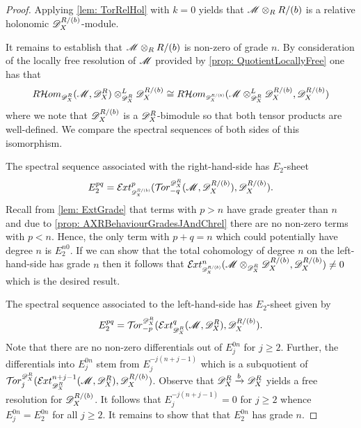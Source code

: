\begin{proof}
  Applying \cref{lem: TorRelHol} with $k=0$ yields that $\mathscr{M} \otimes_R R/(b)$ is a relative holonomic $\mathscr{D}_X^{R/(b)}$-module.

  It remains to establish that $\mathscr{M} \otimes_R R/(b)$ is non-zero of grade $n$.
  By consideration of the locally free resolution of $\mathscr{M}$ provided by \cref{prop: QuotientLocallyFree} one has that
  $$R\Hom_{\scaleto{\D_X^R}{8pt}}(\M,\D_X^R)\otimes_{\scaleto{\D_X^R}{8pt}}^L \D_X^{R/(b)} \cong R \Hom_{\scaleto{\D_X^{R/(b)}}{8pt}}(\M\otimes_{\scaleto{\D_X^R}{8pt}}^L \D_X^{R/(b)}, \D_X^{R/(b)}) $$
  where we note that $\mathscr{D}_X^{R/(b)}$ is a $\mathscr{D}_X^{R}$-bimodule so that both tensor products are well-defined.
  We compare the spectral sequences of both sides of this isomorphism.

  The spectral sequence associated with the right-hand-side has $E_2$-sheet
  $$E^{pq}_2 = \Ex{\D_X^{R/(b)}}{p}(\Tr{\D_X^R}{-q}(\M, \D_X^{R/(b)}), \D_X^{R/(b)}).$$
  Recall from \cref{lem: ExtGrade} that terms with $p>n$ have grade greater than $n$ and due to \cref{prop: AXRBehaviourGradesJAndChrel} there are no non-zero terms with $p<n$.
  Hence, the only term with $p+q = n$ which could potentially have degree $n$ is $E^{n0}_2$.
  If we can show that the total cohomology of degree $n$ on the left-hand-side has grade $n$ then it follows that $\Ex{\D_X^{R/(b)}}{n}(\M\otimes_{\scaleto{\D_X^R}{8pt}} \D_X^{R/(b)}, \D_X^{R/(b)}) \neq 0$ which is the desired result.

  The spectral sequence associated to the left-hand-side has $E_2$-sheet given by
  $$E_2^{pq} =\Tr{\D_X^R}{-p}( \Ex{\D_X^R}{q}(\M,\D_X^R), \D_X^{R/(b)}).$$
  Note that there are no non-zero differentials out of $E_j^{0n}$ for $j\geq 2$.
  Further, the differentials into $E^{0n}_j$ stem from $E^{-j(n+j-1)}_j$ which is a subquotient of $\Tr{\D_X^R}{j}(\Ex{\D_X^R}{n+j-1}(\M,\ab \D_X^R)\ab , \D_X^{R/(b)})$.
  Observe that $\mathscr{D}_X^R \xrightarrow{b} \mathscr{D}_X^R $ yields a free resolution for $\mathscr{D}_X^{R/(b)}$.
  It follows that $E^{-j(n+j-1)}_j=0$ for $j\geq 2$ whence $E_j^{0n} = E_2^{0n}$ for all $j\geq 2$.
  It remains to show that that $E_2^{0n}$ has grade $n$.


\end{proof}
